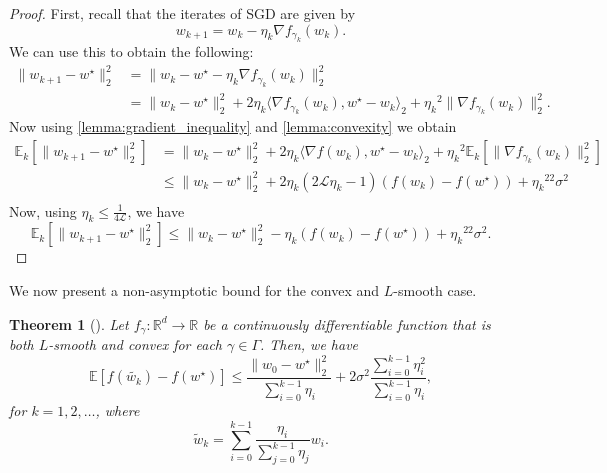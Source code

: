 \documentclass[12pt]{article}
\newtheorem{theorem}{Theorem}[section]
\theoremstyle{definition}
\numberwithin{equation}{section}
\newcommand{\R}{\mathbb{R}}
\newcommand{\E}{\mathbb{E}}
\newcommand{\CL}{\mathcal{L}}
\newcommand{\ev}[1]{\mathbb{E}\left[{#1}\right]}
\newcommand{\norm}[1]{\lVert{#1}\rVert_2}
\newcommand{\scp}[2]{\langle{#1}, {#2}\rangle_2}
\begin{document}
\begin{proof}
  First, recall that the iterates of SGD are given by
  \begin{equation*}
    w_{k+1} = w_{k} - \eta_k \nabla f_{\gamma_k}(w_{k}).
  \end{equation*}
  We can use this to obtain the following:
  \begin{align*}
    \norm{w_{k+1} - w^\star}^2 &= \norm{w_{k} - w^\star - \eta_k \nabla f_{\gamma_k}(w_{k})}^2 \\
    &= \norm{w_{k} - w^\star}^2 + 2 \eta_k \scp{\nabla f_{\gamma_k}(w_{k})}{ w^\star - w_{k}} + {\eta_k}^2\norm{\nabla f_{\gamma_k}(w_{k})}^2.
  \end{align*}
  Now using \autoref{lemma:gradient_inequality} and \autoref{lemma:convexity} we obtain
  \begin{align*}
    \E_k[\norm{w_{k+1} - w^\star}^2] &= \norm{w_{k} - w^\star}^2 + 2 \eta_k \scp{\nabla f(w_{k})}{w^\star - w_{k}}+ {\eta_k}^2\E_k[\norm{\nabla f_{\gamma_k}(w_{k})}^2] \\
    &\leq \norm{w_{k} - w^\star}^2 + 2 \eta_k(2\CL \eta_k - 1)(f(w_{k}) - f(w^\star))+ {\eta_k}^22\sigma^2 \\
  \end{align*}
  Now, using $\eta_k \leq \frac{1}{4 \CL}$, we have
  \begin{equation*}
    \E_k[\norm{w_{k+1} - w^\star}^2] \leq \norm{w_{k} - w^\star}^2 - \eta_k(f(w_{k}) - f(w^\star))+ {\eta_k}^22\sigma^2.
  \end{equation*}
\end{proof}
We now present a non-asymptotic bound for the convex and $L$-smooth case.
\begin{theorem}[]
  \label{thm:SGD_bound}
  Let $f_{\gamma} : \R^d \rightarrow \R$ be a continuously differentiable function that is both $L$-smooth and convex for each $\gamma \in \Gamma$. Then, we have
  \begin{equation*}
    \ev{f(\widetilde{w_{k}}) - f(w^\star)} \leq \frac{\norm{w_{0} - w^\star}^2}{\sum_{i=0}^{k-1}\eta_i} + 2 \sigma^2 \frac{\sum_{i=0}^{k-1}\eta_i^2}{\sum_{i=0}^{k-1}\eta_i},
  \end{equation*}
  for $k = 1, 2, \dots$, where 
  \begin{equation*}
    \widetilde{w}_k = \sum_{i=0}^{k-1}\frac{\eta_i}{\sum_{j=0}^{k-1}\eta_j}w_i.
  \end{equation*}
\end{theorem}
\end{document}
